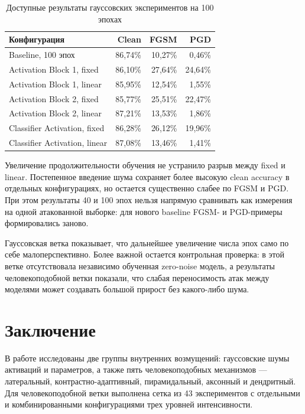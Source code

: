 \documentclass[a4paper]{article}
\begin{document}
\begin{table}[H]
\centering
\small
\begin{tabular}{lrrr}
\toprule
Конфигурация & Clean & FGSM & PGD\\
\midrule
Baseline, 100 эпох & 86{,}74\% & 10{,}27\% & 0{,}46\%\\
Activation Block 1, fixed & 86{,}10\% & 27{,}64\% & 24{,}64\%\\
Activation Block 1, linear & 85{,}95\% & 12{,}54\% & 1{,}55\%\\
Activation Block 2, fixed & 85{,}77\% & 25{,}51\% & 22{,}47\%\\
Activation Block 2, linear & 87{,}21\% & 13{,}53\% & 1{,}86\%\\
Classifier Activation, fixed & 86{,}28\% & 26{,}12\% & 19{,}96\%\\
Classifier Activation, linear & 87{,}08\% & 13{,}46\% & 1{,}41\%\\
\bottomrule
\end{tabular}
\caption{Доступные результаты гауссовских экспериментов на 100 эпохах}
\label{tab:gaussian-100}
\end{table}

Увеличение продолжительности обучения не устранило разрыв между fixed и linear. Постепенное введение шума сохраняет более высокую clean accuracy в отдельных конфигурациях, но остается существенно слабее по FGSM и PGD. При этом результаты 40 и 100 эпох нельзя напрямую сравнивать как измерения на одной атакованной выборке: для нового baseline FGSM- и PGD-примеры формировались заново.

Гауссовская ветка показывает, что дальнейшее увеличение числа эпох само по себе малоперспективно. Более важной остается контрольная проверка: в этой ветке отсутствовала независимо обученная zero-noise модель, а результаты человекоподобной ветки показали, что слабая переносимость атак между моделями может создавать большой прирост без какого-либо шума.

\section{Заключение}

В работе исследованы две группы внутренних возмущений: гауссовские шумы активаций и параметров, а также пять человекоподобных механизмов --- латеральный, контрастно-адаптивный, пирамидальный, аксонный и дендритный. Для человекоподобной ветки выполнена сетка из 43 экспериментов с отдельными и комбинированными конфигурациями трех уровней интенсивности.
\end{document}
